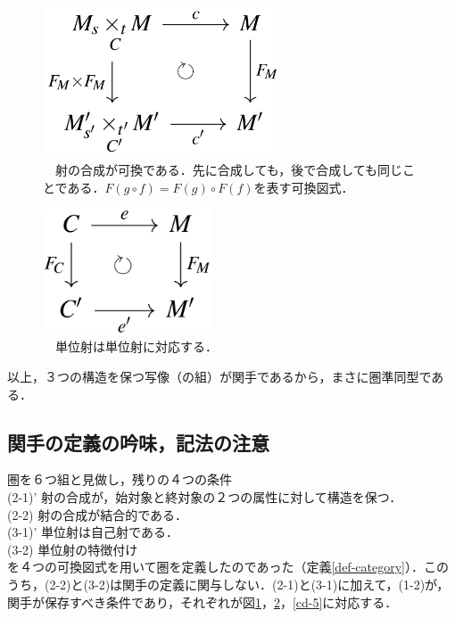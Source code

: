 \documentclass[uplatex, 12pt, a4paper, dvipdfmx]{jsarticle}
\begin{document}
\begin{figure}[ht]\begin{center} \caption{\label{cd-6}　射の合成が可換である．先に合成しても，後で合成しても同じことである．$F(g\circ f)=F(g)\circ F(f)$を表す可換図式．}
    \includegraphics[width=7cm]{cd-6.png}
\end{center}\end{figure}

\begin{figure}[ht]\begin{center} \caption{\label{cd-7}　単位射は単位射に対応する．}
    \includegraphics[width=5cm]{cd-7.png}
\end{center}\end{figure}

以上，３つの構造を保つ写像（の組）が関手であるから，まさに圏準同型である．

\subsection{関手の定義の吟味，記法の注意}
圏を６つ組と見做し，残りの４つの条件\\
\hspace{3mm} (2-1)'\; 射の合成が，始対象と終対象の２つの属性に対して構造を保つ．\\
\hspace{3mm} (2-2)\; 射の合成が結合的である．\\
\hspace{3mm} (3-1)'\; 単位射は自己射である．\\
\hspace{3mm} (3-2)\; 単位射の特徴付け\\
を４つの可換図式を用いて圏を定義したのであった（定義\ref{def-category}）．このうち，(2-2)と(3-2)は関手の定義に関与しない．(2-1)と(3-1)に加えて，(1-2)が，関手が保存すべき条件であり，それぞれが図\ref{cd-6}，\ref{cd-7}，\ref{cd-5}に対応する．
\end{document}
